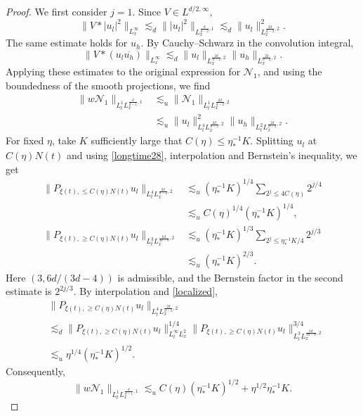 \documentclass[reqno,11pt]{amsart}
\theoremstyle{plain}
\theoremstyle{definition}
\numberwithin{equation}{section}
\numberwithin{theorem}{section}
\def\geq{\geqslant}
\def\leq{\leqslant}
\begin{document}
\begin{proof}
We first consider $j=1$. Since $V\in L^{d/2,\infty}$,
\[
 \|V*|u_l|^2\|_{L_x^\infty}
 \lesssim_d\||u_l|^2\|_{L_x^{\frac d{d-2},1}}
 \lesssim_d\|u_l\|_{L_x^{\frac{2d}{d-2},2}}^2.
\]
The same estimate holds for $u_h$. By Cauchy--Schwarz in the convolution
integral,
\[
 \|V*(u_l\overline{u_h})\|_{L_x^\infty}
 \lesssim_d\|u_l\|_{L_x^{\frac{2d}{d-2},2}}
             \|u_h\|_{L_x^{\frac{2d}{d-2},2}}.
\]
Applying these estimates to the original expression for $\mathcal N_1$,
and using the boundedness of the smooth projections, we find
\begin{align*}
 \|w\mathcal N_1\|_{L_t^1L_x^{\frac d{d-1},1}}
 &\lesssim_u\|\mathcal N_1\|_{L_t^1L_x^{\frac{2d}{d-2},2}}\\
 &\lesssim_u\|u_l\|_{L_t^4L_x^{\frac{2d}{d-2},2}}^2
             \|u_h\|_{L_t^2L_x^{\frac{2d}{d-2},2}}.
\end{align*}
For fixed $\eta$, take $K$ sufficiently large that
$C(\eta)\leq\eta_{\ast}^{-1}K$. Splitting $u_l$ at $C(\eta)N(t)$ and
using \eqref{longtime28}, interpolation and Bernstein's inequality, we get
\begin{align*}
 \|P_{\xi(t),\leq C(\eta)N(t)}u_l\|_
                       {L_t^4L_x^{\frac{2d}{d-2},2}}
 &\lesssim_u(\eta_{\ast}^{-1}K)^{1/4}
       \sum_{2^j\leq4C(\eta)}2^{j/4}\\
 &\lesssim_u C(\eta)^{1/4}(\eta_{\ast}^{-1}K)^{1/4},\\
 \|P_{\xi(t),\geq C(\eta)N(t)}u_l\|_
                       {L_t^3L_x^{\frac{6d}{3d-8},2}}
 &\lesssim_u(\eta_{\ast}^{-1}K)^{1/3}
       \sum_{2^j\leq\eta_{\ast}^{-1}K/4}2^{j/3}\\
 &\lesssim_u(\eta_{\ast}^{-1}K)^{2/3}.
\end{align*}
Here $(3,6d/(3d-4))$ is admissible, and the Bernstein factor in the second
estimate is $2^{2j/3}$. By interpolation and \eqref{localized},
\begin{align*}
 &\|P_{\xi(t),\geq C(\eta)N(t)}u_l\|_
                       {L_t^4L_x^{\frac{2d}{d-2},2}}\\
 &\lesssim_d\|P_{\xi(t),\geq C(\eta)N(t)}u_l\|_{L_t^\infty L_x^2}^{1/4}
       \|P_{\xi(t),\geq C(\eta)N(t)}u_l\|_
                       {L_t^3L_x^{\frac{6d}{3d-8},2}}^{3/4}\\
 &\lesssim_u\eta^{1/4}(\eta_{\ast}^{-1}K)^{1/2}.
\end{align*}
Consequently,
\[
 \|w\mathcal N_1\|_{L_t^1L_x^{\frac d{d-1},1}}
 \lesssim_u C(\eta)(\eta_{\ast}^{-1}K)^{1/2}
                   +\eta^{1/2}\eta_{\ast}^{-1}K.
\]


\end{proof}
\end{document}
